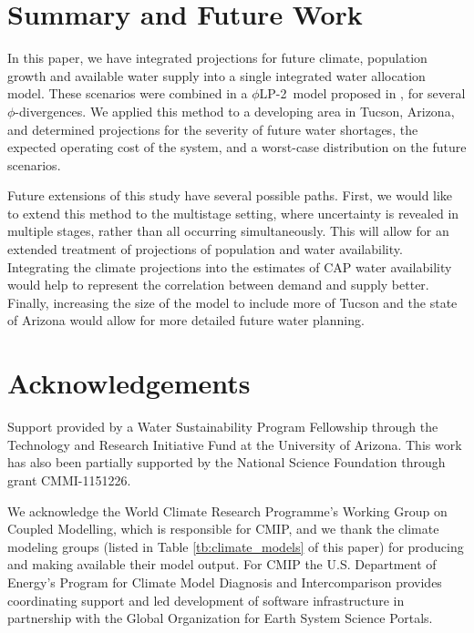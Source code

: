 \documentclass[opre,nonblindrev]{informs3} %
\newcommand{\plp}{$\phi$LP-2}
\begin{document}
\section{Summary and Future Work}
\label{sec:concl}

In this paper, we have integrated projections for future climate, population growth and available water supply into a single integrated water allocation model.
These scenarios were combined in a \plp\ model proposed in \cite{love2013phi}, for several $\phi$-divergences.
We applied this method to a developing area in Tucson, Arizona, and determined projections for the severity of future water shortages, the expected operating cost of the system, and a worst-case distribution on the future scenarios.

Future extensions of this study have several possible paths.
First, we would like to extend this method to the multistage setting, where uncertainty is revealed in multiple stages, rather than all occurring simultaneously.
This will allow for an extended treatment of projections of population and water availability.
Integrating the climate projections into the estimates of CAP water availability would help to represent the correlation between demand and supply better.
Finally, increasing the size of the model to include more of Tucson and the state of Arizona would allow for more detailed future water planning.




%

\section*{Acknowledgements}
Support provided by a Water Sustainability Program Fellowship through the Technology and Research Initiative Fund at the University of Arizona.
This work has also been partially supported by the National Science Foundation through grant CMMI-1151226.

We acknowledge the World Climate Research Programme's Working Group on Coupled Modelling, which is responsible for CMIP, and we thank the climate modeling groups (listed in Table \ref{tb:climate_models} of this paper) for producing and making available their model output.
For CMIP the U.S. Department of Energy's Program for Climate Model Diagnosis and Intercomparison provides coordinating support and led development of software infrastructure in partnership with the Global Organization for Earth System Science Portals.
\end{document}
